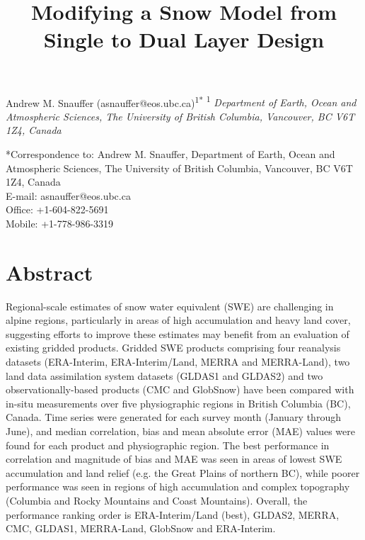 \documentclass[12pt]{article}
\title{Modifying a Snow Model from Single to Dual Layer Design}
\author{}
\date{}
\begin{document}
\maketitle
\begin{center}
Andrew M. Snauffer (asnauffer@eos.ubc.ca)\textsuperscript{1*}
\newline
\newline
\footnotesize{
\textsuperscript{1}\textit{
Department of Earth, Ocean and Atmospheric Sciences,
The University of British Columbia,
Vancouver, BC V6T 1Z4,
Canada}
}
\end{center}

\begin{footnotesize}
\noindent
*Correspondence to: Andrew M. Snauffer, 
Department of Earth, Ocean and Atmospheric Sciences,
The University of British Columbia,
Vancouver, BC V6T 1Z4,
Canada
\\E-mail: asnauffer@eos.ubc.ca
\\Office: +1-604-822-5691
\\Mobile: +1-778-986-3319

\end{footnotesize}

\newpage

\section{Abstract}
Regional-scale estimates of snow water equivalent (SWE) are challenging in alpine regions, particularly in areas of high accumulation and heavy land cover, suggesting efforts to improve these estimates may benefit from an evaluation of existing gridded products.  Gridded SWE products comprising four reanalysis datasets (ERA-Interim, ERA-Interim/Land, MERRA and MERRA-Land), two land data assimilation system datasets (GLDAS1 and GLDAS2) and two observationally-based products (CMC and GlobSnow) have been compared with in-situ measurements over five physiographic regions in British Columbia (BC), Canada.  Time series were generated for each survey month (January through June), and median correlation, bias and mean absolute error (MAE) values were found for each product and physiographic region.  
The best performance in correlation and magnitude of bias and MAE was
seen in areas of lowest SWE accumulation and land relief (e.g. the Great Plains of northern BC), while poorer performance was seen in regions of high accumulation and complex topography (Columbia and Rocky Mountains and Coast Mountains).
Overall, the performance ranking order is ERA-Interim/Land (best), GLDAS2, MERRA, CMC, GLDAS1, MERRA-Land, GlobSnow and ERA-Interim.
\end{document}
